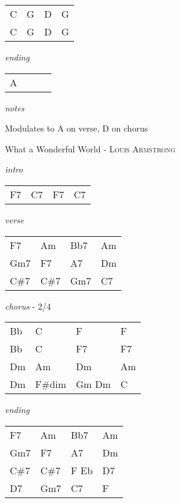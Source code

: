 \documentclass[12pt]{article}
\begin{document}
\begin{tabular}{|P{1.25in}|P{1.25in}|P{1.25in}|P{1.25in}|}
  C & G  & D  &  G \\
  C & G  & D  &  G
\end{tabular}

\textit{ending}

\begin{tabular}{|P{1.25in}|P{1.25in}|P{1.25in}|P{1.25in}|}
  A &   &   &   \\
\end{tabular}

\textit{notes}

Modulates to A on verse, D on chorus

\newpage

{\Huge What a Wonderful World} {\huge - \textsc{Louis Armstrong}}

\huge
\textit{intro}

\begin{tabular}{|P{1.25in}|P{1.25in}|P{1.25in}|P{1.25in}|}
  F7 & C7  & F7  &  C7 \\
\end{tabular}

\textit{verse}

\begin{tabular}{|P{1.25in}|P{1.25in}|P{1.25in}|P{1.25in}|}
  F7   &  Am  & Bb7  &  Am \\
  Gm7  &  F7  & A7   &  Dm \\
  C\#7 &  C\#7 & Gm7 & C7  \\
\end{tabular}

\textit{chorus} - 2/4

\begin{tabular}{|P{1.25in}|P{1.25in}|P{1.25in}|P{1.25in}|}
  Bb &  C & F  &  F \\
  Bb &  C & F7 &  F7 \\
  Dm & Am & Dm & Am \\
  Dm & F\#dim & Gm Dm & C \\
\end{tabular}

\textit{ending}

\begin{tabular}{|P{1.25in}|P{1.25in}|P{1.25in}|P{1.25in}|}
  F7   &  Am  & Bb7  &  Am \\
  Gm7  &  F7  & A7   &  Dm \\
  C\#7 &  C\#7 & F Eb & D7  \\
  D7   & Gm7  & C7   &  F \\
\end{tabular}
\end{document}
